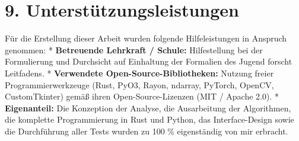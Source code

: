\documentclass[
  11pt,
]{article}
\begin{document}
\section{9. Unterstützungsleistungen}\label{unterstuxfctzungsleistungen}

Für die Erstellung dieser Arbeit wurden folgende Hilfeleistungen in
Anspruch genommen: * \textbf{Betreuende Lehrkraft / Schule:}
Hilfestellung bei der Formulierung und Durchsicht auf Einhaltung der
Formalien des Jugend forscht Leitfadens. * \textbf{Verwendete
Open-Source-Bibliotheken:} Nutzung freier Programmierwerkzeuge (Rust,
PyO3, Rayon, ndarray, PyTorch, OpenCV, CustomTkinter) gemäß ihren
Open-Source-Lizenzen (MIT / Apache 2.0). * \textbf{Eigenanteil:} Die
Konzeption der Analyse, die Ausarbeitung der Algorithmen, die komplette
Programmierung in Rust und Python, das Interface-Design sowie die
Durchführung aller Tests wurden zu 100 \% eigenständig von mir erbracht.
\end{document}
